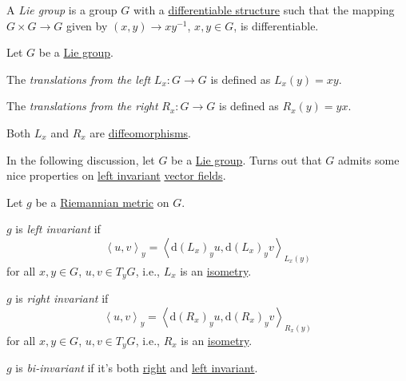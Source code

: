\begin{definition}\label{def:Lie-group}
	A \emph{Lie group} is a group \(G\) with a \hyperref[def:smooth-structure]{differentiable structure} such that the mapping \(G \times G \to G\) given by \((x, y) \to xy^{-1} \), \(x, y\in G\), is differentiable.
\end{definition}

\begin{definition*}[Transformation]
	Let \(G\) be a \hyperref[def:Lie-group]{Lie group}.
	\begin{definition}\label{def:left-transformation}
		The \emph{translations from the left} \(L_x \colon G \to G\) is defined as \(L_x(y) = xy\).
	\end{definition}
	\begin{definition}\label{def:right-transformation}
		The \emph{translations from the right} \(R_x \colon G \to G\) is defined as \(R_x(y) = yx\).
	\end{definition}
\end{definition*}

\begin{remark}
	Both \(L_x\) and \(R_x\) are \hyperref[def:diffeomorphism]{diffeomorphisms}.
\end{remark}

In the following discussion, let \(G\) be a \hyperref[def:Lie-group]{Lie group}. Turns out that \(G\) admits some nice properties on \hyperref[def:vector-field-left-invariant]{left invariant} \hyperref[def:vector-field]{vector fields}.

\begin{definition*}
	Let \(g\) be a \hyperref[def:Riemannian-metric]{Riemannian metric} on \(G\).

	\begin{definition}\label{def:Riemannian-metric-left-invariant}
		\(g\) is \emph{left invariant} if
		\[
			\left\langle u, v \right\rangle _y = \left\langle \mathrm{d} (L_x) _y u, \mathrm{d} (L_x)_y v \right\rangle _{L_x(y)}
		\]
		for all \(x, y\in G\), \(u, v\in T_y G\), i.e., \(L_x\) is an \hyperref[def:isometry]{isometry}.
	\end{definition}

	\begin{definition}\label{def:Riemannian-metric-right-invariant}
		\(g\) is \emph{right invariant} if
		\[
			\left\langle u, v \right\rangle _y = \left\langle \mathrm{d} (R_x)_y u, \mathrm{d} (R_x)_y v \right\rangle _{R_x(y)}
		\]
		for all \(x, y\in G\), \(u, v\in T_y G\), i.e., \(R_x\) is an \hyperref[def:isometry]{isometry}.
	\end{definition}

	\begin{definition}[Bi-invariant]\label{def:Riemannian-metric-bi-invariant}
		\(g\) is \emph{bi-invariant} if it's both \hyperref[def:Riemannian-metric-right-invariant]{right} and \hyperref[def:Riemannian-metric-left-invariant]{left invariant}.
	\end{definition}
\end{definition*}

